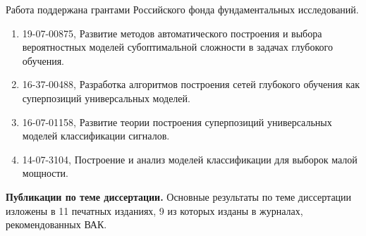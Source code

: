 Работа поддержана грантами Российского фонда фундаментальных исследований.
\begin{enumerate}
\item 19-07-00875, Развитие методов автоматического построения и выбора вероятностных моделей субоптимальной сложности в задачах глубокого обучения.
\item 16-37-00488, Разработка алгоритмов построения сетей глубокого обучения как суперпозиций универсальных моделей.
\item 16-07-01158, Развитие теории построения суперпозиций универсальных моделей классификации сигналов.
\item 14-07-3104,  Построение и анализ моделей классификации для выборок малой мощности.
\end{enumerate}

\vspace{0.5cm}
\textbf{Публикации по теме диссертации.} Основные результаты по теме диссертации изложены в 11 печатных изданиях, 9 из которых изданы в журналах, рекомендованных ВАК.

